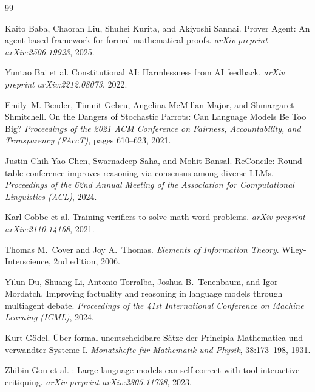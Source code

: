 \documentclass[11pt]{article}
\begin{document}

\begin{thebibliography}{99}

Kaito Baba, Chaoran Liu, Shuhei Kurita, and Akiyoshi Sannai.
\newblock Prover Agent: An agent-based framework for formal mathematical proofs.
\newblock \emph{arXiv preprint arXiv:2506.19923}, 2025.

Yuntao Bai et al.
\newblock Constitutional {AI}: Harmlessness from {AI} feedback.
\newblock \emph{arXiv preprint arXiv:2212.08073}, 2022.

Emily~M. Bender, Timnit Gebru, Angelina McMillan-Major, and Shmargaret Shmitchell.
\newblock On the Dangers of Stochastic Parrots: Can Language Models Be Too Big?
\newblock \emph{Proceedings of the 2021 ACM Conference on Fairness, Accountability, and
Transparency (FAccT)}, pages 610--623, 2021.

Justin Chih-Yao Chen, Swarnadeep Saha, and Mohit Bansal.
\newblock ReConcile: Round-table conference improves reasoning via consensus among diverse
{LLMs}.
\newblock \emph{Proceedings of the 62nd Annual Meeting of the Association for Computational
Linguistics (ACL)}, 2024.

Karl Cobbe et al.
\newblock Training verifiers to solve math word problems.
\newblock \emph{arXiv preprint arXiv:2110.14168}, 2021.

Thomas M.\ Cover and Joy A.\ Thomas.
\newblock \emph{Elements of Information Theory}.
\newblock Wiley-Interscience, 2nd edition, 2006.

Yilun Du, Shuang Li, Antonio Torralba, Joshua B.\ Tenenbaum, and Igor Mordatch.
\newblock Improving factuality and reasoning in language models through multiagent debate.
\newblock \emph{Proceedings of the 41st International Conference on Machine Learning (ICML)},
2024.

Kurt G\"{o}del.
\newblock \"{U}ber formal unentscheidbare S\"{a}tze der Principia Mathematica und verwandter
Systeme I.
\newblock \emph{Monatshefte f\"{u}r Mathematik und Physik}, 38:173--198, 1931.

Zhibin Gou et al.
: Large language models can self-correct with tool-interactive critiquing.
\newblock \emph{arXiv preprint arXiv:2305.11738}, 2023.


\end{thebibliography}
\end{document}
